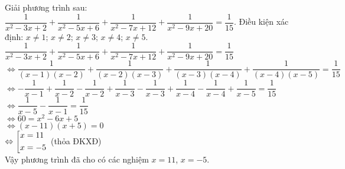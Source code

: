 \begin{bt}%
	Giải phương trình sau:\\ $\dfrac{1}{x^2-3x+2} + \dfrac{1}{x^2-5x+6} + \dfrac{1}{x^2-7x+12} + \dfrac{1}{x^2-9x+20} = \dfrac{1}{15}$.
	\loigiai
	{
		Điều kiện xác định: $x \neq 1$; $x \neq 2$; $x \neq 3$; $x \neq 4$; $x \neq 5$.\\
		\hspace*{0.6cm} $\dfrac{1}{x^2-3x+2} + \dfrac{1}{x^2-5x+6} + \dfrac{1}{x^2-7x+12} + \dfrac{1}{x^2-9x+20} = \dfrac{1}{15}$\\
		$\Leftrightarrow \dfrac{1}{(x-1)(x-2)} + \dfrac{1}{(x-2)(x-3)} + \dfrac{1}{(x-3)(x-4)} + \dfrac{1}{(x-4)(x-5)} = \dfrac{1}{15}$\\
		$\Leftrightarrow -\dfrac{1}{x-1} + \dfrac{1}{x-2} -\dfrac{1}{x-2} + \dfrac{1}{x-3} -\dfrac{1}{x-3} + \dfrac{1}{x-4} -\dfrac{1}{x-4} + \dfrac{1}{x-5} = \dfrac{1}{15}$\\
		$\Leftrightarrow \dfrac{1}{x-5} - \dfrac{1}{x-1} = \dfrac{1}{15}$\\
		$\Leftrightarrow 60 = x^2 - 6x + 5$\\
		$\Leftrightarrow (x-11)(x+5) = 0$\\
		$\Leftrightarrow \left[\begin{aligned}& x = 11 \\& x = -5\end{aligned}\right.$ (thỏa ĐKXĐ)\\
		Vậy phương trình đã cho có các nghiệm $x = 11$, $x = - 5$.
	}
\end{bt}


